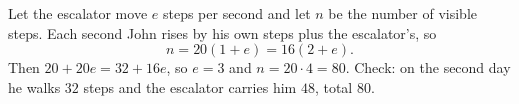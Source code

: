 Let the escalator move $e$ steps per second and let $n$ be the number of visible steps. Each second John rises by his own steps plus the escalator's, so
\[
n=20(1+e)=16(2+e).
\]
Then $20+20e=32+16e$, so $e=3$ and $n=20\cdot4=\boxed{80}$. Check: on the second day he walks $32$ steps and the escalator carries him $48$, total $80$.
